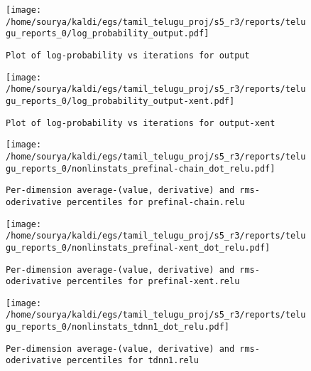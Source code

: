 \documentclass[prl,10pt,twocolumn]{revtex4}
\begin{document}
\newpage
\begin{figure}[h]
  \begin{center}
    \caption{\texttt{Plot of log-probability vs iterations for output}}
    \texttt{[image: /home/sourya/kaldi/egs/tamil\_telugu\_proj/s5\_r3/reports/telugu\_reports\_0/log\_probability\_output.pdf]}
  \end{center}
\end{figure}
\clearpage


\newpage
\begin{figure}[h]
  \begin{center}
    \caption{\texttt{Plot of log-probability vs iterations for output-xent}}
    \texttt{[image: /home/sourya/kaldi/egs/tamil\_telugu\_proj/s5\_r3/reports/telugu\_reports\_0/log\_probability\_output-xent.pdf]}
  \end{center}
\end{figure}
\clearpage


\newpage
\begin{figure}[h]
  \begin{center}
    \caption{\texttt{Per-dimension average-(value, derivative) and rms-oderivative percentiles for prefinal-chain.relu}}
    \texttt{[image: /home/sourya/kaldi/egs/tamil\_telugu\_proj/s5\_r3/reports/telugu\_reports\_0/nonlinstats\_prefinal-chain\_dot\_relu.pdf]}
  \end{center}
\end{figure}
\clearpage


\newpage
\begin{figure}[h]
  \begin{center}
    \caption{\texttt{Per-dimension average-(value, derivative) and rms-oderivative percentiles for prefinal-xent.relu}}
    \texttt{[image: /home/sourya/kaldi/egs/tamil\_telugu\_proj/s5\_r3/reports/telugu\_reports\_0/nonlinstats\_prefinal-xent\_dot\_relu.pdf]}
  \end{center}
\end{figure}
\clearpage


\newpage
\begin{figure}[h]
  \begin{center}
    \caption{\texttt{Per-dimension average-(value, derivative) and rms-oderivative percentiles for tdnn1.relu}}
    \texttt{[image: /home/sourya/kaldi/egs/tamil\_telugu\_proj/s5\_r3/reports/telugu\_reports\_0/nonlinstats\_tdnn1\_dot\_relu.pdf]}
  \end{center}
\end{figure}
\clearpage
\end{document}
